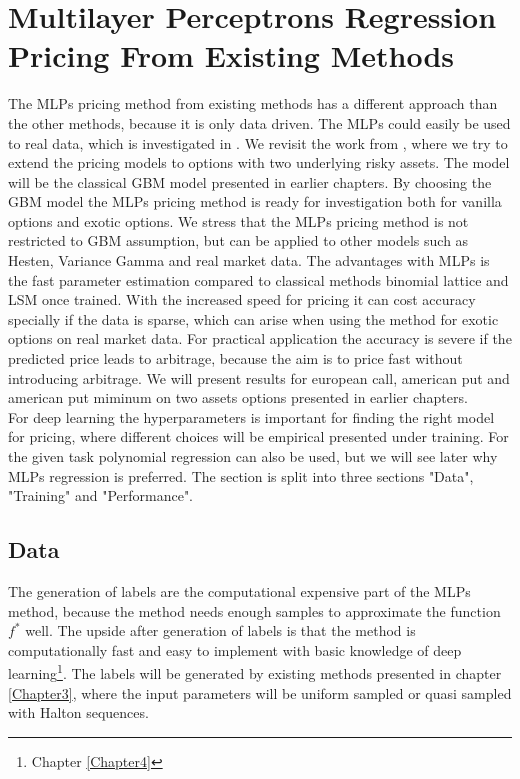 \section{Multilayer Perceptrons Regression Pricing From Existing Methods}
The MLPs pricing method from existing methods has a different approach than the other methods, because it is only data driven. The MLPs could easily be used to real data, which is investigated in \parencite{GasparRaquel20}. We revisit the work from \parencite{HirsaAli2019}, where we try to extend the pricing models to options with two underlying risky assets. The model will be the classical GBM model presented in earlier chapters. By choosing the GBM model the MLPs pricing method is ready for investigation both for vanilla options and exotic options. We stress that the MLPs pricing method is not restricted to GBM assumption, but can be applied to other models such as Hesten, Variance Gamma and real market data. The advantages with MLPs is the fast parameter estimation compared to classical methods binomial lattice and LSM once trained. With the increased speed for pricing it can cost accuracy specially if the data is sparse, which can arise when using the method for exotic options on real market data. For practical application the accuracy is severe if the predicted price leads to arbitrage, because the aim is to price fast without introducing arbitrage. We will present results for european call, american put and american put miminum on two assets options presented in earlier chapters.\\

For deep learning the hyperparameters is important for finding the right model for pricing, where different choices will be empirical presented under training. For the given task polynomial regression can also be used, but we will see later why MLPs regression is preferred. The section is split into three sections "Data", "Training" and "Performance".

\subsection{Data}
The generation of labels are the computational expensive part of the MLPs method, because the method needs enough samples to approximate the function $f^*$ well. The upside after generation of labels is that the method is computationally fast and easy to implement with basic knowledge of deep learning\footnote{Chapter \ref{Chapter4}}. The labels will be generated by existing methods presented in chapter \ref{Chapter3}, where the input parameters will be uniform sampled or quasi sampled with Halton sequences.\\


